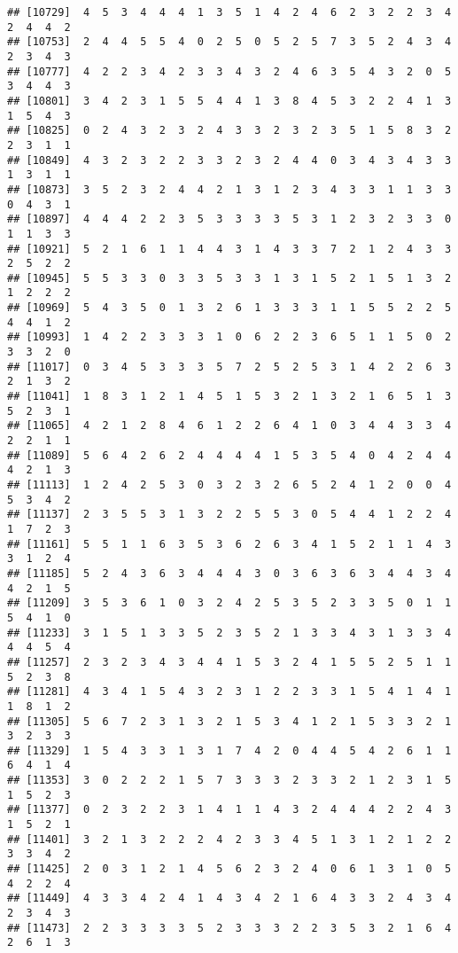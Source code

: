 \documentclass[
]{article}
\begin{document}
\begin{verbatim}
## [10729]  4  5  3  4  4  4  1  3  5  1  4  2  4  6  2  3  2  2  3  4  2  4  4  2
## [10753]  2  4  4  5  5  4  0  2  5  0  5  2  5  7  3  5  2  4  3  4  2  3  4  3
## [10777]  4  2  2  3  4  2  3  3  4  3  2  4  6  3  5  4  3  2  0  5  3  4  4  3
## [10801]  3  4  2  3  1  5  5  4  4  1  3  8  4  5  3  2  2  4  1  3  1  5  4  3
## [10825]  0  2  4  3  2  3  2  4  3  3  2  3  2  3  5  1  5  8  3  2  2  3  1  1
## [10849]  4  3  2  3  2  2  3  3  2  3  2  4  4  0  3  4  3  4  3  3  1  3  1  1
## [10873]  3  5  2  3  2  4  4  2  1  3  1  2  3  4  3  3  1  1  3  3  0  4  3  1
## [10897]  4  4  4  2  2  3  5  3  3  3  3  5  3  1  2  3  2  3  3  0  1  1  3  3
## [10921]  5  2  1  6  1  1  4  4  3  1  4  3  3  7  2  1  2  4  3  3  2  5  2  2
## [10945]  5  5  3  3  0  3  3  5  3  3  1  3  1  5  2  1  5  1  3  2  1  2  2  2
## [10969]  5  4  3  5  0  1  3  2  6  1  3  3  3  1  1  5  5  2  2  5  4  4  1  2
## [10993]  1  4  2  2  3  3  3  1  0  6  2  2  3  6  5  1  1  5  0  2  3  3  2  0
## [11017]  0  3  4  5  3  3  3  5  7  2  5  2  5  3  1  4  2  2  6  3  2  1  3  2
## [11041]  1  8  3  1  2  1  4  5  1  5  3  2  1  3  2  1  6  5  1  3  5  2  3  1
## [11065]  4  2  1  2  8  4  6  1  2  2  6  4  1  0  3  4  4  3  3  4  2  2  1  1
## [11089]  5  6  4  2  6  2  4  4  4  4  1  5  3  5  4  0  4  2  4  4  4  2  1  3
## [11113]  1  2  4  2  5  3  0  3  2  3  2  6  5  2  4  1  2  0  0  4  5  3  4  2
## [11137]  2  3  5  5  3  1  3  2  2  5  5  3  0  5  4  4  1  2  2  4  1  7  2  3
## [11161]  5  5  1  1  6  3  5  3  6  2  6  3  4  1  5  2  1  1  4  3  3  1  2  4
## [11185]  5  2  4  3  6  3  4  4  4  3  0  3  6  3  6  3  4  4  3  4  4  2  1  5
## [11209]  3  5  3  6  1  0  3  2  4  2  5  3  5  2  3  3  5  0  1  1  5  4  1  0
## [11233]  3  1  5  1  3  3  5  2  3  5  2  1  3  3  4  3  1  3  3  4  4  4  5  4
## [11257]  2  3  2  3  4  3  4  4  1  5  3  2  4  1  5  5  2  5  1  1  5  2  3  8
## [11281]  4  3  4  1  5  4  3  2  3  1  2  2  3  3  1  5  4  1  4  1  1  8  1  2
## [11305]  5  6  7  2  3  1  3  2  1  5  3  4  1  2  1  5  3  3  2  1  3  2  3  3
## [11329]  1  5  4  3  3  1  3  1  7  4  2  0  4  4  5  4  2  6  1  1  6  4  1  4
## [11353]  3  0  2  2  2  1  5  7  3  3  3  2  3  3  2  1  2  3  1  5  1  5  2  3
## [11377]  0  2  3  2  2  3  1  4  1  1  4  3  2  4  4  4  2  2  4  3  1  5  2  1
## [11401]  3  2  1  3  2  2  2  4  2  3  3  4  5  1  3  1  2  1  2  2  3  3  4  2
## [11425]  2  0  3  1  2  1  4  5  6  2  3  2  4  0  6  1  3  1  0  5  4  2  2  4
## [11449]  4  3  3  4  2  4  1  4  3  4  2  1  6  4  3  3  2  4  3  4  2  3  4  3
## [11473]  2  2  3  3  3  3  5  2  3  3  3  2  2  3  5  3  2  1  6  4  2  6  1  3

\end{verbatim}
\end{document}
